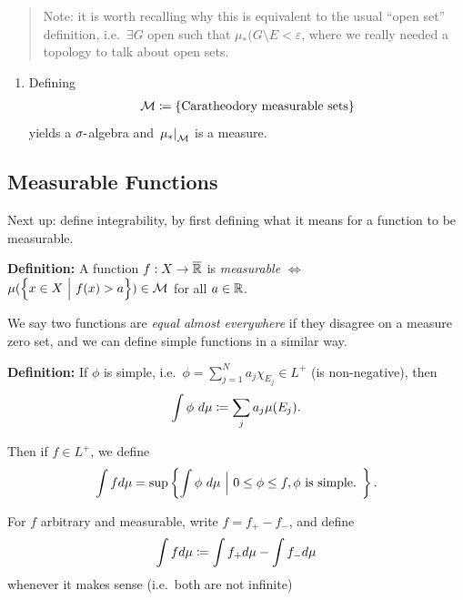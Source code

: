 \begin{quote}
Note: it is worth recalling why this is equivalent to the usual ``open
set'' definition, i.e.~\(\exists G\) open such that
\(\mu_*(G\setminus E < \varepsilon\), where we really needed a topology
to talk about open sets.
\end{quote}

\begin{enumerate}
\def\labelenumi{\arabic{enumi}.}
\setcounter{enumi}{2}
\tightlist
\item
  Defining
  \begin{align*}
  \mathcal M \coloneqq \left\{{\text{Caratheodory measurable sets}}\right\}
  \end{align*} yields a \(\sigma{\hbox{-}}\)algebra and
  \({\left.{\mu_*}\right|_{\mathcal M}}\) is a measure.
\end{enumerate}

\hypertarget{measurable-functions}{%
\subsection{Measurable Functions}\label{measurable-functions}}

Next up: define integrability, by first defining what it means for a
function to be measurable.

\textbf{Definition:} A function \(f: X \to \overline{{\mathbb{R}}}\) is
\emph{measurable} \(\iff\)
\(\mu(\left\{{x\in X {~\mathrel{\Big|}~} f(x) > a}\right\}) \in \mathcal M\) for all
\(a\in {\mathbb{R}}\).

We say two functions are \emph{equal almost everywhere} if they disagree
on a measure zero set, and we can define simple functions in a similar
way.

\textbf{Definition:} If \(\phi\) is simple,
i.e.~\(\phi = \sum_{j=1}^N a_j \chi_{E_j} \in L^+\) (is non-negative),
then
\begin{align*}
\int \phi ~d\mu \coloneqq \sum_j a_j \mu(E_j)
.\end{align*}

Then if \(f\in L^+\), we define
\begin{align*}
\int f d\mu = \sup \left\{{\int \phi ~d\mu {~\mathrel{\Big|}~} 0\leq \phi \leq f, \phi\text{ is simple. }}\right\}
.\end{align*}

For \(f\) arbitrary and measurable, write \(f = f_+ - f_-\), and define
\begin{align*}
\int f d\mu \coloneqq \int f_+ d\mu - \int f_- d\mu
\end{align*} whenever it makes sense (i.e.~both are not infinite)

